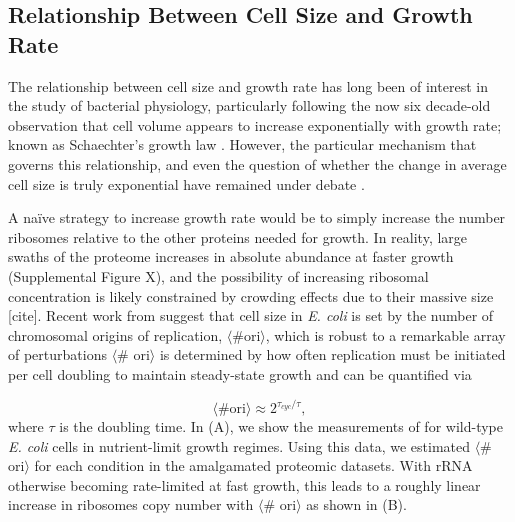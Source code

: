 \subsection{Relationship Between Cell Size and Growth Rate}

The relationship between cell size and growth rate has long been of interest in
the study of bacterial physiology, particularly following the now six decade-old
observation that cell volume appears to increase exponentially with growth rate;
known as Schaechter's growth law  \citep{schaechter1958, taheriaraghi2015}.
However, the particular mechanism that governs this relationship, and even the
question of whether the change in average cell size is truly exponential have
remained under debate \citep{si2017, harris2018}.

A na\"ive strategy to increase growth rate  would be to simply increase the
number ribosomes relative to the other proteins needed for growth. In reality,
large swaths of the proteome increases in absolute abundance at faster growth
(Supplemental Figure X), and the possibility of increasing ribosomal
concentration is likely constrained by crowding effects due to their massive
size [cite]. Recent work from \cite{si2017} suggest that cell size in \textit{E.
coli} is set by the number of chromosomal origins of replication,
$\langle\text{\# ori}\rangle$, which is robust to a remarkable array of
perturbations $\langle$\# ori$\rangle$ is determined by how often replication
must be initiated per cell doubling to maintain steady-state growth and can be
quantified via

\begin{equation}
    \langle \text{\# ori} \rangle \approx 2^{\tau_{cyc} / \tau},
    \label{eq:Nori}
\end{equation}
where $\tau$ is the doubling time. In (A), we
show the measurements of \cite{si2017} for wild-type \textit{E. coli} cells
in nutrient-limit growth regimes. Using this data, we estimated $\langle$\#
ori$\rangle$ for each condition in the amalgamated proteomic datasets. With
rRNA otherwise becoming rate-limited at fast growth, this leads to a
roughly linear increase in ribosomes copy number with $\langle$\#
ori$\rangle$ as shown in (B).

